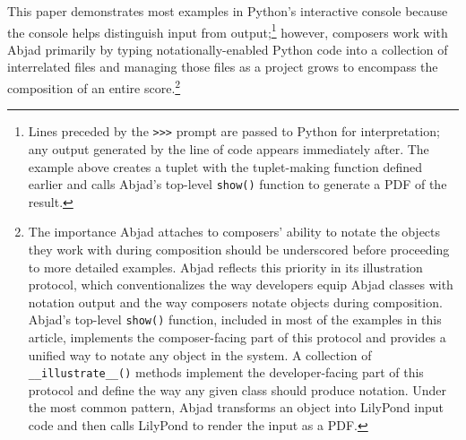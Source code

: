 \documentclass{article}
\begin{document}
\noindent This paper demonstrates most examples in Python's interactive console
because the console helps distinguish input from output;\footnote{Lines
preceded by the \texttt{>>>} prompt are passed to Python for interpretation;
any output generated by the line of code appears immediately after. The example
above creates a tuplet with the tuplet-making function defined earlier and
calls Abjad's top-level \texttt{show()} function to generate a PDF of the
result.} however, composers work with Abjad primarily by typing
notationally-enabled Python code into a collection of interrelated files and
managing those files as a project grows to encompass the composition of an
entire score.\footnote{The importance Abjad attaches to composers' ability to
notate the objects they work with during composition should be underscored
before proceeding to more detailed examples. Abjad reflects this priority in
its illustration protocol, which conventionalizes the way developers equip
Abjad classes with notation output and the way composers notate objects during
composition. Abjad's top-level \texttt{show()} function, included in most of
the examples in this article, implements the composer-facing part of this
protocol and provides a unified way to notate any object in the system. A
collection of \texttt{\_\_illustrate\_\_()} methods implement the
developer-facing part of this protocol and define the way any given class
should produce notation. Under the most common pattern, Abjad transforms an
object into LilyPond input code and then calls LilyPond to render the input as
a PDF.}

\end{document}
